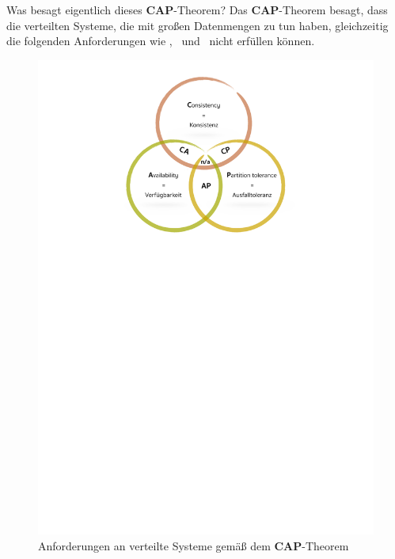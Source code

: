 Was besagt eigentlich dieses \textbf{CAP}-Theorem? Das \textbf{CAP}-Theorem besagt, dass die verteilten Systeme, die mit großen Datenmengen zu tun haben, gleichzeitig die folgenden Anforderungen wie \Cap, \cAp\ und \caP\ nicht erfüllen können.
\begin{figure}
\centering
\includegraphics[trim = 0mm 189mm 0mm 9mm, clip, width=1.0\textwidth]{resources/myPictureForCAP}
\caption[\textbf{CAP}-Theorem]{Anforderungen an verteilte Systeme gemäß dem \textbf{CAP}-Theorem}
\label{img:cap}
\end{figure}
